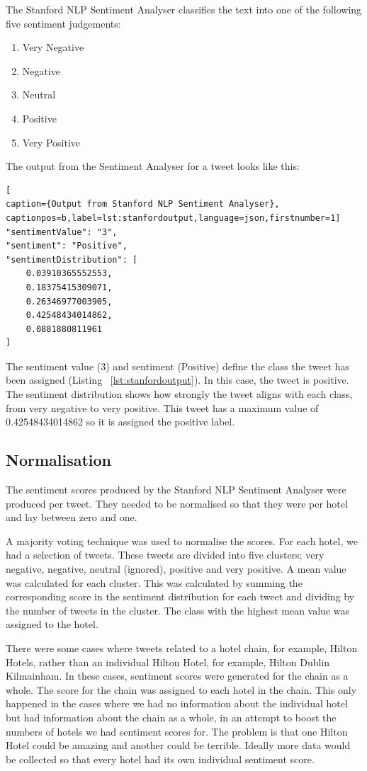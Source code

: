 The Stanford NLP Sentiment Analyser classifies the text into one of the following five sentiment judgements: 
\begin{enumerate}
    \item Very Negative
    \item Negative
    \item Neutral
    \item Positive
    \item Very Positive
\end{enumerate}

The output from the Sentiment Analyser for a tweet looks like this:

\begin{lstlisting}[
caption={Output from Stanford NLP Sentiment Analyser},
captionpos=b,label=lst:stanfordoutput,language=json,firstnumber=1]
"sentimentValue": "3",
"sentiment": "Positive",
"sentimentDistribution": [
    0.03910365552553,
    0.18375415309071,
    0.26346977003905,
    0.42548434014862,
    0.0881880811961
]
\end{lstlisting}

The sentiment value (3) and sentiment (Positive) define the class the tweet has been assigned (Listing ~\ref{lst:stanfordoutput}). In this case, the tweet is positive. The sentiment distribution shows how strongly the tweet aligns with each class, from very negative to very positive. This tweet has a maximum value of 0.42548434014862 so it is assigned the positive label.

\subsection{Normalisation}

The sentiment scores produced by the Stanford NLP Sentiment Analyser were produced per tweet. They needed to be normalised so that they were per hotel and lay between zero and one.

A majority voting technique was used to normalise the scores. For each hotel, we had a selection of tweets. These tweets are divided into five clusters; very negative, negative, neutral (ignored), positive and very positive. A mean value was calculated for each cluster. This was calculated by summing the corresponding score in the sentiment distribution for each tweet and dividing by the number of tweets in the cluster. The class with the highest mean value was assigned to the hotel.

There were some cases where tweets related to a hotel chain, for example, Hilton Hotels, rather than an individual Hilton Hotel, for example, Hilton Dublin Kilmainham. In these cases, sentiment scores were generated for the chain as a whole. The score for the chain was assigned to each hotel in the chain. This only happened in the cases where we had no information about the individual hotel but had information about the chain as a whole, in an attempt to boost the numbers of hotels we had sentiment scores for. The problem is that one Hilton Hotel could be amazing and another could be terrible. Ideally more data would be collected so that every hotel had its own individual sentiment score.


